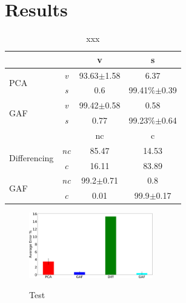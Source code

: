 \documentclass{article}
\begin{document}
\section{Results}
\label{sec:results}
\begin{table}
\begin{tabular}{ |l|c c c| }
\hline
& & v & s\\
\hline
\multirow{2}{*}{PCA} & \emph{v} & 93.63$\pm$1.58&6.37\\
& \emph{s}& 0.6& 99.41\%$\pm$0.39\\
\hline
\multirow{2}{*}{GAF} & \emph{v} & 99.42$\pm$0.58&0.58\\
& \emph{s}& 0.77& 99.23\%$\pm$0.64\\
\hline
\hline
& & nc & c\\
\hline
\multirow{2}{*}{Differencing} & \emph{nc} & 85.47 & 14.53\\
& \emph{c}& 16.11 & 83.89\\
\multirow{2}{*}{GAF} & \emph{nc} & 99.2$\pm$0.71 & 0.8\\
& \emph{c}& 0.01 & 99.9$\pm$0.17\\
\hline
\end{tabular}
\caption{xxx}
\label{tab:cm}
\end{table}

\begin{figure}
 \includegraphics[width=0.48\textwidth]{results-crop.pdf}
 \label{fig:results}
 \caption{Test}
\end{figure}
\end{document}
